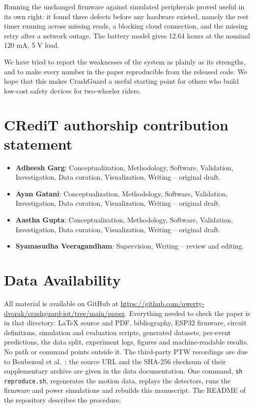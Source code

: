 \documentclass[10pt,a4paper]{article}
\begin{document}
Running the unchanged firmware against simulated peripherals proved useful in its own right: it found three defects before any hardware existed, namely the rest timer running across missing reads, a blocking cloud connection, and the missing retry after a network outage. The battery model gives 12.64 hours at the nominal 120 mA, 5 V load.

We have tried to report the weaknesses of the system as plainly as its strengths, and to make every number in the paper reproducible from the released code. We hope that this makes CrashGuard a useful starting point for others who build low-cost safety devices for two-wheeler riders.

\section*{CRediT authorship contribution statement}
\begin{itemize}
\item \textbf{Adheesh Garg}: Conceptualization, Methodology, Software, Validation, Investigation, Data curation, Visualization, Writing -- original draft.
\item \textbf{Ayan Gatani}: Conceptualization, Methodology, Software, Validation, Investigation, Data curation, Visualization, Writing -- original draft.
\item \textbf{Aastha Gupta}: Conceptualization, Methodology, Software, Validation, Investigation, Data curation, Visualization, Writing -- original draft.
\item \textbf{Syamasudha Veeragandham}: Supervision, Writing -- review and editing.
\end{itemize}

\section*{Data Availability}
All material is available on GitHub at \url{https://github.com/qwerty-dvorak/crashguard-iot/tree/main/paper}. Everything needed to check the paper is in that directory: LaTeX source and PDF, bibliography, ESP32 firmware, circuit definitions, simulation and evaluation scripts, generated datasets, per-event predictions, the data split, experiment logs, figures and machine-readable results. No path or command points outside it. The third-party PTW recordings are due to Boubezoul et al.~\cite{boubezoul2019dataset}; the source URL and the SHA-256 checksum of their supplementary archive are given in the data documentation. One command, \texttt{sh reproduce.sh}, regenerates the motion data, replays the detectors, runs the firmware and power simulations and rebuilds this manuscript. The README of the repository describes the procedure.

\begingroup
\renewcommand{\bibfont}{\small}
\endgroup
\end{document}
